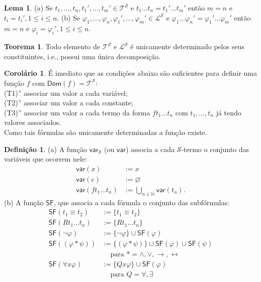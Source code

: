 \documentclass[11pt]{article}
\theoremstyle{definition}
\newtheorem{defn}{Definição}
\newtheorem{theorem}{Teorema}
\newtheorem{corollary}{Corolário}
\newtheorem{lemma}{Lema}
\newcommand{\sse}{\leftrightarrow}
\newcommand{\mc}[1]{\mathcal{#1}}
\newcommand{\msf}[1]{\mathsf{#1}}
\newcommand{\mbb}[1]{\mathbb{#1}}
\begin{document}
\begin{lemma}
(a) Se $t_1,\dots,t_n,t_1',\dots,t_m'\in\mc{T}^\mc{S}$ e $t_1\dots t_n=t_1'\dots t_m'$ então $m=n$ e $t_i=t_i',1\le i\le n$.
(b) Se $\varphi_1,\dots,\varphi_n,\varphi_1',\dots,\varphi_m'\in\mc{L}^\mc{S}$ e $\varphi_1\dots\varphi_n'=\varphi_1'\dots\varphi_m'$ então $m=n$ e $\varphi_i=\varphi_i',1\le i\le n$.
\end{lemma}

\begin{theorem}
Todo elemento de $\mc{T}^\mc{S}$ e $\mc{L}^\mc{S}$ é unicamente determinado pelos seus constituintes, i.e., possui uma única decomposição.
\end{theorem}

\begin{corollary}
É imediato que as condições abaixo são suficientes para definir uma função $f$ com $\msf{Dom}(f)=\mc{T}^\mc{S}$:\\
(T1)'' associar um valor a cada variável;\\
(T2)'' associar um valor a cada constante;\\
(T3)'' associar um valor a cada termo da forma $ft_1\dots t_n$ com $t_1,\dots,t_n$ já tendo valores associados.\\
Como tais fórmulas são unicamente determinadas a função existe.
\end{corollary}

\begin{shaded}
\begin{defn}
(a) A função $\msf{var}_\mc{S}$ (ou $\msf{var}$) associa a cada $\mc{S}$-termo o conjunto das variáveis que ocorrem nele:
\begin{align*}
    \msf{var}(x) & := {x}\\
    \msf{var}(c) & := \varnothing\\
    \msf{var}(ft_1\dots t_n) & := \bigcup_{n\in\mbb{N}}\msf{var}(t_n).
\end{align*}
(b) A função $\msf{SF}$, que associa a cada fórmula o conjunto das subfórmulas:
\begin{align*}
    \msf{SF}(t_1\equiv t_2) & := \{t_1\equiv t_2\}\\
    \msf{SF}(Rt_1\dots t_n) & := \{Rt_1\dots t_n\}\\
    \msf{SF}(\neg\varphi) & := \{\neg\varphi\}\cup\msf{SF}(\varphi)\\
    \msf{SF}((\varphi*\psi)) & := \{(\varphi*\psi)\}\cup\msf{SF}(\varphi)\cup\msf{SF}(\psi)\\
    & ~~~~ \text{ para }*=\wedge,\vee,\to,\sse\\
    \msf{SF}(\forall x\varphi) & := \{Q x\varphi\}\cup\msf{SF}(\varphi)\\
    & ~~~~ \text{ para }Q=\forall,\exists
\end{align*}
\end{defn}
\end{shaded}
\end{document}
